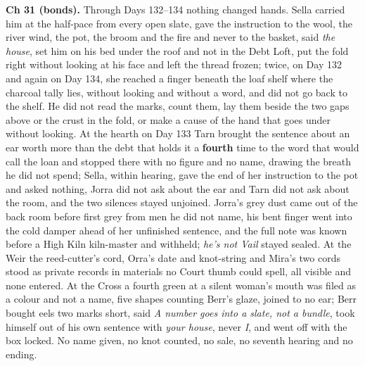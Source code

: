 \documentclass{design/chronicle}
\begin{document}
{\textbf{Ch 31 (bonds).} Through Days 132–134 nothing changed hands. Sella carried him at the half-pace from every open slate, gave the instruction to the wool, the river wind, the pot, the broom and the fire and never to the basket, said \emph{the house}, set him on his bed under the roof and not in the Debt Loft, put the fold right without looking at his face and left the thread frozen; twice, on Day 132 and again on Day 134, she reached a finger beneath the loaf shelf where the charcoal tally lies, without looking and without a word, and did not go back to the shelf. He did not read the marks, count them, lay them beside the two gaps above or the crust in the fold, or make a cause of the hand that goes under without looking. At the hearth on Day 133 Tarn brought the sentence about an ear worth more than the debt that holds it a \textbf{fourth} time to the word that would call the loan and stopped there with no figure and no name, drawing the breath he did not spend; Sella, within hearing, gave the end of her instruction to the pot and asked nothing, Jorra did not ask about the ear and Tarn did not ask about the room, and the two silences stayed unjoined. Jorra’s grey dust came out of the back room before first grey from men he did not name, his bent finger went into the cold damper ahead of her unfinished sentence, and the full note was known before a High Kiln kiln-master and withheld; \emph{he’s not Vail} stayed sealed. At the Weir the reed-cutter’s cord, Orra’s date and knot-string and Mira’s two cords stood as private records in materials no Court thumb could spell, all visible and none entered. At the Cross a fourth green at a silent woman’s mouth was filed as a colour and not a name, five shapes counting Berr’s glaze, joined to no ear; Berr bought eels two marks short, said \emph{A number goes into a slate, not a bundle}, took himself out of his own sentence with \emph{your house}, never \emph{I}, and went off with the box locked. No name given, no knot counted, no sale, no seventh hearing and no ending.

}
\end{document}
